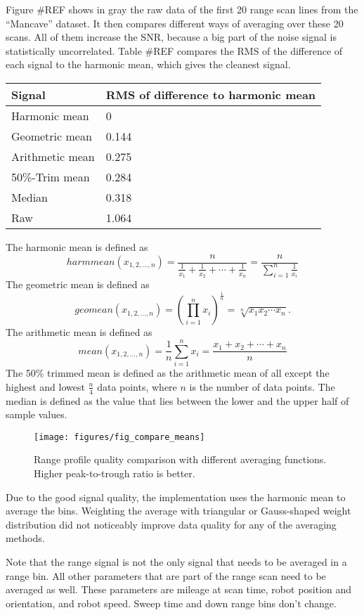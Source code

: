 Figure \#REF shows in gray the raw data of the first 20 range scan lines
from the ``Mancave'' dataset. It then compares different ways of
averaging over these 20 scans. All of them increase the SNR, because a
big part of the noise signal is statistically uncorrelated. Table \#REF
compares the RMS of the difference of each signal to the harmonic mean,
which gives the cleanest signal.

\begin{longtable}[]{@{}ll@{}}
\toprule
Signal & RMS of difference to harmonic mean\tabularnewline
\midrule
\endhead
Harmonic mean & 0\tabularnewline
Geometric mean & 0.144\tabularnewline
Arithmetic mean & 0.275\tabularnewline
50\%-Trim mean & 0.284\tabularnewline
Median & 0.318\tabularnewline
Raw & 1.064\tabularnewline
\bottomrule
\end{longtable}

The harmonic mean is defined as
\[harmmean(x_{1,2,...,n}) = \frac{n}{\frac1{x_1} + \frac1{x_2} + \cdots + \frac1{x_n}} = \frac{n}{\sum\limits_{i=1}^n \frac1{x_i}}\]
The geometric mean is defined as
\[geomean(x_{1,2,...,n}) = \left(\prod_{i=1}^n x_i \right)^\frac{1}{n} = \sqrt[n]{x_1 x_2 \cdots x_n}.\]
The arithmetic mean is defined as
\[mean(x_{1,2,...,n}) = \frac{1}{n}\sum_{i=1}^n x_i=\frac{x_1+x_2+\cdots+x_n}{n}\]
The 50\% trimmed mean is defined as the arithmetic mean of all except
the highest and lowest \(\frac{n}4\) data points, where \(n\) is the
number of data points. The median is defined as the value that lies
between the lower and the upper half of sample values.

\begin{figure}[htp]
    \centering
    \label{fig:fig_compare_means}
    \texttt{[image: figures/fig\_compare\_means]}
    \caption{Range profile quality comparison with different averaging functions. Higher peak-to-trough ratio is better.}
\end{figure}

Due to the good signal quality, the implementation uses the harmonic
mean to average the bins. Weighting the average with triangular or
Gauss-shaped weight distribution did not noticeably improve data quality
for any of the averaging methods.

Note that the range signal is not the only signal that needs to be
averaged in a range bin. All other parameters that are part of the range
scan need to be averaged as well. These parameters are mileage at scan
time, robot position and orientation, and robot speed. Sweep time and
down range bins don't change.

